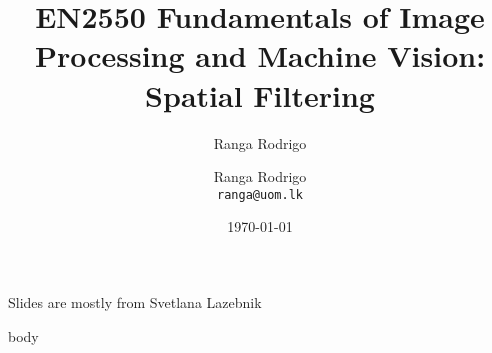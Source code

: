 \documentclass[aspectratio=169,xcolor={svgnames}, beamer, 10pt]{beamer}
\title{EN2550 Fundamentals of Image Processing and Machine Vision: Spatial Filtering}
\author{Ranga Rodrigo}
\author[]{Ranga Rodrigo\\ \texttt{ranga@uom.lk}}
\institute[]{The University of Moratuwa, Sri Lanka}
\date{\today}
\begin{document}
    \begin{frame}
        \titlepage
        Slides are mostly from Svetlana Lazebnik
    \end{frame}


    {body}
\end{document}
